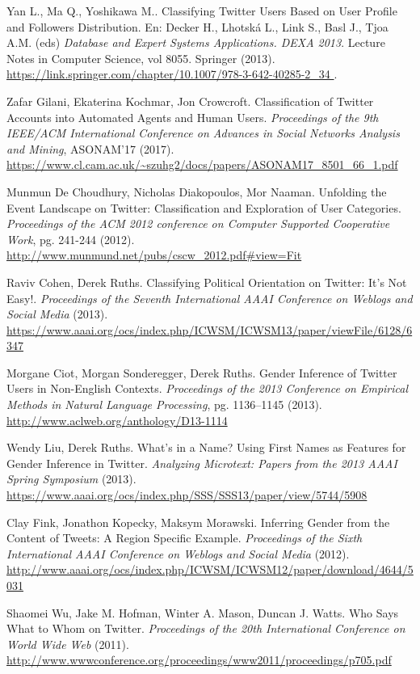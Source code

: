 \begin{thebibliography}{3}
 Yan L., Ma Q., Yoshikawa M.. Classifying Twitter Users Based on User Profile and Followers Distribution. En: Decker H., Lhotská L., Link S., Basl J., Tjoa A.M. (eds) {\em Database and Expert Systems Applications. DEXA 2013}. Lecture Notes in Computer Science, vol 8055. Springer (2013).
\url{https://link.springer.com/chapter/10.1007/978-3-642-40285-2_34 }.

 Zafar Gilani, Ekaterina Kochmar, Jon Crowcroft. Classification 
of Twitter Accounts into Automated Agents and Human Users.
{\em Proceedings of the 9th IEEE/ACM International Conference on Advances in 
Social Networks Analysis and Mining}, ASONAM'17 (2017).
\url{https://www.cl.cam.ac.uk/~szuhg2/docs/papers/ASONAM17_8501_66_1.pdf }

 Munmun De Choudhury, Nicholas Diakopoulos,
Mor Naaman. Unfolding the Event Landscape on Twitter:
Classification and Exploration of User Categories. 
{\em Proceedings of the ACM 2012 conference on Computer Supported Cooperative 
Work}, pg. 241-244 (2012).
\url{http://www.munmund.net/pubs/cscw_2012.pdf#view=Fit }

 Raviv Cohen, Derek Ruths. Classifying Political Orientation on Twitter: 
It’s Not Easy!. {\em Proceedings of the Seventh International AAAI Conference on Weblogs and 
Social Media} (2013).
\url{ https://www.aaai.org/ocs/index.php/ICWSM/ICWSM13/paper/viewFile/6128/6347   }


 Morgane Ciot, Morgan Sonderegger, Derek Ruths. 
Gender Inference of Twitter Users in Non-English Contexts.
{\em Proceedings of the 2013 Conference on Empirical Methods in Natural Language Processing},
pg. 1136–1145 (2013).
\url{ http://www.aclweb.org/anthology/D13-1114 }

 Wendy Liu, Derek Ruths. What’s in a Name? Using First Names as Features 
for Gender Inference in Twitter.
{\em Analyzing Microtext: Papers from the 2013 AAAI Spring Symposium} (2013).
\url{ https://www.aaai.org/ocs/index.php/SSS/SSS13/paper/view/5744/5908 }

 Clay Fink, Jonathon Kopecky, Maksym Morawski. Inferring Gender from 
the Content of Tweets: A Region Specific Example.
{\em Proceedings of the Sixth International AAAI Conference on Weblogs and Social Media} (2012).
\url{ http://www.aaai.org/ocs/index.php/ICWSM/ICWSM12/paper/download/4644/5031 }

 Shaomei Wu, Jake M. Hofman, Winter A. Mason, Duncan J. Watts.  
Who Says What to Whom on Twitter.
{\em  Proceedings of the 20th International Conference on World Wide Web} (2011).
\url{ http://www.wwwconference.org/proceedings/www2011/proceedings/p705.pdf }


\end{thebibliography}
